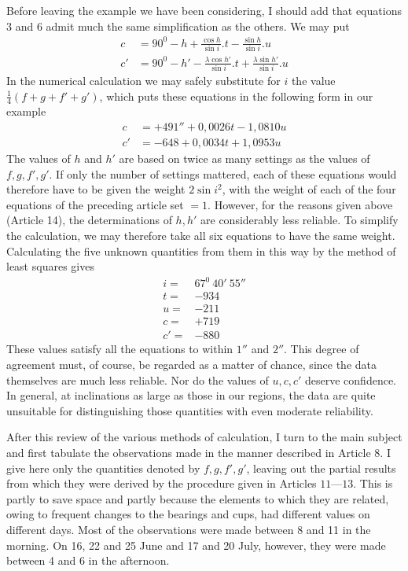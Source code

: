 Before leaving the example we have been considering, I should add that equations $3$ and $6$ admit much the same simplification as the others. We may put
\[
\begin{aligned}
c&=90^0-h+\frac{\cos h}{\sin i}.t-\frac{\sin h}{\sin i}.u\\
c'&=90^0-h'-\frac{\lambda\cos h'}{\sin i}.t+\frac{\lambda\sin h'}{\sin i}.u
\end{aligned}
\]
In the numerical calculation we may safely substitute for $i$ the value
$\frac14(f+g+f'+g')$, which puts these equations in the following form in our example
\[
\begin{aligned}
c&=+491''+0{,}0026t-1{,}0810u\\
c'&=-648+0{,}0034t+1{,}0953u
\end{aligned}
\]
The values of $h$ and $h'$ are based on twice as many settings as the values of $f,g,f',g'$. If only the number of settings mattered, each of these equations would therefore have to be given the weight $2\sin i^2$, with the weight of each of the four equations of the preceding article set $=1$. However, for the reasons given above (Article 14), the determinations of $h,h'$ are considerably less reliable. To simplify the calculation, we may therefore take all six equations to have the same weight. Calculating the five unknown quantities from them in this way by the method of least squares gives
\[
\begin{array}{rl}
i=&67^0\ 40'\ 55''\\
t=&-934\\
u=&-211\\
c=&+719\\
c'=&-880
\end{array}
\]
These values satisfy all the equations to within $1''$ and $2''$. This degree of agreement must, of course, be regarded as a matter of chance, since the data themselves are much less reliable. Nor do the values of $u,c,c'$ deserve confidence. In general, at inclinations as large as those in our regions, the data are quite unsuitable for distinguishing those quantities with even moderate reliability.

After this review of the various methods of calculation, I turn to the main subject and first tabulate the observations made in the manner described in Article 8. I give here only the quantities denoted by $f,g,f',g'$, leaving out the partial results from which they were derived by the procedure given in Articles $11$---$13$. This is partly to save space and partly because the elements to which they are related,
owing to frequent changes to the bearings and cups, had different values on different days. Most of the observations were made between 8 and 11 in the morning. On 16, 22 and 25 June and 17 and 20 July, however, they were made between 4 and 6 in the afternoon.

